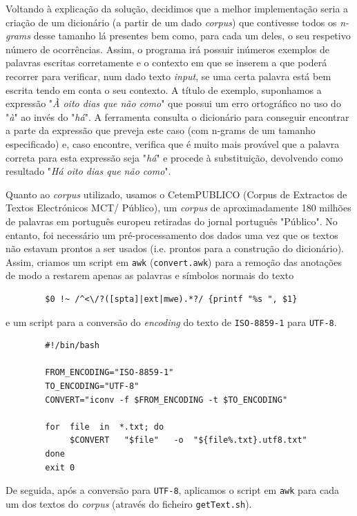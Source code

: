 \documentclass{article}
\begin{document}
Voltando à explicação da solução, decidimos que a melhor implementação seria a criação de um dicionário (a partir de um dado \textit{corpus}) que contivesse todos os \textit{n-grams} desse tamanho lá presentes bem como, para cada um deles, o seu respetivo número de ocorrências. Assim, o programa irá possuir inúmeros exemplos de palavras escritas corretamente e o contexto em que se inserem a que poderá recorrer para verificar, num dado texto \textit{input}, se uma certa palavra está bem escrita tendo em conta o seu contexto. A título de exemplo, suponhamos a expressão "\textit{À oito dias que não como}" que possui um erro ortográfico no uso do "\textit{à}" ao invés do "\textit{há}". A ferramenta consulta o dicionário para conseguir encontrar a parte da expressão que preveja este caso (com n-grams de um tamanho especificado) e, caso encontre, verifica que é muito mais provável que a palavra correta para esta expressão seja "\textit{há}" e procede à substituição, devolvendo como resultado "\textit{Há oito dias que não como}".

Quanto ao \textit{corpus} utilizado, usamos o CetemPUBLICO (Corpus de Extractos de Textos Electrónicos MCT/ Público), um \textit{corpus} de aproximadamente 180 milhões de palavras em português europeu retiradas do jornal português "Público"\cite{jornal}. No entanto, foi necessário um pré-processamento dos dados uma vez que os textos não estavam prontos a ser usados (i.e. prontos para a construção do dicionário). Assim, criamos um script em \texttt{awk} (\texttt{convert.awk}) para a remoção das anotações de modo a restarem apenas as palavras e símbolos normais do texto

\begin{verbatim}
        $0 !~ /^<\/?([spta]|ext|mwe).*?/ {printf "%s ", $1}
\end{verbatim}

e um script para a conversão do \textit{encoding} do texto de \texttt{ISO-8859-1} para \texttt{UTF-8}.

\begin{verbatim}
        #!/bin/bash

        FROM_ENCODING="ISO-8859-1"
        TO_ENCODING="UTF-8"
        CONVERT="iconv -f $FROM_ENCODING -t $TO_ENCODING"
        
        for  file  in  *.txt; do
             $CONVERT   "$file"   -o  "${file%.txt}.utf8.txt"
        done
        exit 0
\end{verbatim}

De seguida, após a conversão para \texttt{UTF-8}, aplicamos o script em \texttt{awk} para cada um dos textos do \textit{corpus} (através do ficheiro \texttt{getText.sh}).
\end{document}
